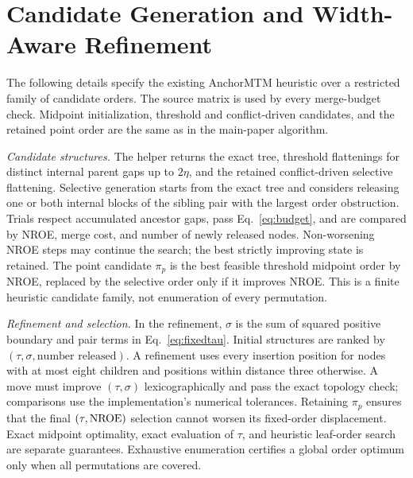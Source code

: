 \documentclass[10pt]{article}
\begin{document}
\begin{algorithm}[tp]
\caption{Optimal Merge Barriers for a Fixed Leaf Order}\label{alg:barriers}
\end{algorithm}

\section{Candidate Generation and Width-Aware Refinement}\label{sec:search}
The following details specify the existing AnchorMTM heuristic over a restricted family of candidate orders. The source matrix is used by every merge-budget check. Midpoint initialization, threshold and conflict-driven candidates, and the retained point order are the same as in the main-paper algorithm.

\emph{Candidate structures.} The helper returns the exact tree, threshold flattenings for distinct internal parent gaps up to $2\eta$, and the retained conflict-driven selective flattening. Selective generation starts from the exact tree and considers releasing one or both internal blocks of the sibling pair with the largest order obstruction. Trials respect accumulated ancestor gaps, pass Eq.~\ref{eq:budget}, and are compared by NROE, merge cost, and number of newly released nodes. Non-worsening NROE steps may continue the search; the best strictly improving state is retained. The point candidate $\pi_p$ is the best feasible threshold midpoint order by NROE, replaced by the selective order only if it improves NROE. This is a finite heuristic candidate family, not enumeration of every permutation.

\emph{Refinement and selection.} In the refinement, $\sigma$ is the sum of squared positive boundary and pair terms in Eq.~\ref{eq:fixedtau}. Initial structures are ranked by $(\tau,\sigma,\text{number released})$. A refinement uses every insertion position for nodes with at most eight children and positions within distance three otherwise. A move must improve $(\tau,\sigma)$ lexicographically and pass the exact topology check; comparisons use the implementation's numerical tolerances. Retaining $\pi_p$ ensures that the final $(\tau,\mathrm{NROE})$ selection cannot worsen its fixed-order displacement. Exact midpoint optimality, exact evaluation of $\tau$, and heuristic leaf-order search are separate guarantees. Exhaustive enumeration certifies a global order optimum only when all permutations are covered.
\end{document}
